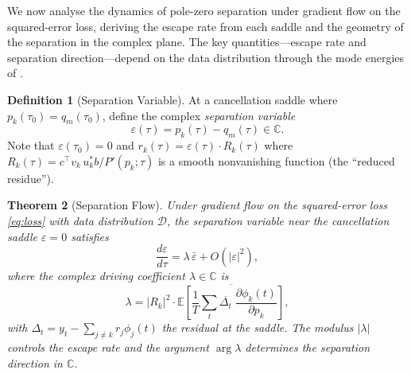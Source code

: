 \documentclass[11pt,a4paper]{article}
\newtheorem{theorem}{Theorem}[section]
\theoremstyle{definition}
\newtheorem{definition}[theorem]{Definition}
\newcommand{\C}{\mathbb{C}}
\newcommand{\E}{\mathbb{E}}
\newcommand{\cD}{\mathcal{D}}
\newcommand{\eps}{\varepsilon}
\begin{document}
We now analyse the dynamics of pole-zero separation under gradient
flow on the squared-error loss, deriving the escape rate from each
saddle and the geometry of the separation in the complex plane.
The key quantities---escape rate and separation direction---depend
on the data distribution through the mode energies of
.

\begin{definition}[Separation Variable]\label{def:separation}
At a cancellation saddle where $p_k(\tau_0) = q_m(\tau_0)$,
define the complex \emph{separation variable}
\begin{equation}
  \eps(\tau) = p_k(\tau) - q_m(\tau) \in \C.
\end{equation}
Note that $\eps(\tau_0) = 0$ and $r_k(\tau) = \eps(\tau)
\cdot R_k(\tau)$ where
$R_k(\tau) = c^{\top} v_k \, u_k^* b / P'(p_k;\tau)$
is a smooth nonvanishing function (the ``reduced residue'').
\end{definition}

\begin{theorem}[Separation Flow]\label{thm:separation}
Under gradient flow on the squared-error loss
\eqref{eq:loss} with data distribution $\cD$, the separation
variable near the cancellation saddle $\eps = 0$ satisfies
\begin{equation}\label{eq:separation_flow}
  \frac{d\eps}{d\tau}
  = \lambda\,\bar{\eps} + O(|\eps|^2),
\end{equation}
where the complex driving coefficient $\lambda \in \C$ is
\begin{equation}\label{eq:lambda_general}
  \lambda = |R_k|^2 \cdot \overline{
    \E\!\left[\frac{1}{T}\sum_t
    \overline{\Delta_t}\;\frac{\partial\phi_k(t)}
    {\partial p_k}\right]
  },
\end{equation}
with $\Delta_t = y_t - \sum_{j\neq k}r_j\phi_j(t)$ the residual
at the saddle. The modulus $|\lambda|$ controls the escape rate
and the argument $\arg\lambda$ determines the separation direction
in $\C$.
\end{theorem}
\end{document}
